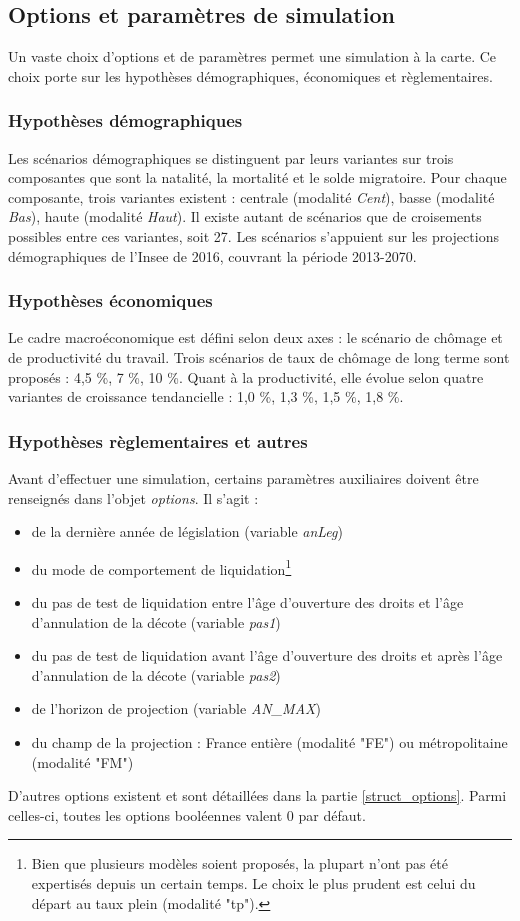 \subsection{Options et paramètres de simulation}
Un vaste choix d'options et de paramètres permet une simulation à la carte. Ce choix porte sur les hypothèses démographiques, économiques et règlementaires.

\subsubsection{Hypothèses démographiques}
Les scénarios démographiques se distinguent par leurs variantes sur trois composantes que sont la natalité, la mortalité et le solde migratoire. Pour chaque composante, trois variantes existent : centrale (modalité \textit{Cent}), basse (modalité \textit{Bas}), haute (modalité \textit{Haut}). Il existe autant de scénarios que de croisements possibles entre ces variantes, soit 27. Les scénarios s'appuient sur les projections démographiques de l'Insee de 2016, couvrant la période 2013-2070.

\subsubsection{Hypothèses économiques}
Le cadre macroéconomique est défini selon deux axes : le scénario de chômage et de productivité du travail. Trois scénarios de taux de chômage de long terme sont proposés : 4,5 \%, 7 \%, 10 \%. Quant à la productivité, elle évolue selon quatre variantes de croissance tendancielle : 1,0 \%, 1,3 \%, 1,5 \%, 1,8 \%.

\subsubsection{Hypothèses règlementaires et autres}
Avant d'effectuer une simulation, certains paramètres auxiliaires doivent être renseignés dans l'objet \textit{options}. Il s'agit :
\begin{itemize}
\item de la dernière année de législation (variable \textit{anLeg})
\item du mode de comportement de liquidation\footnote{Bien que plusieurs modèles soient proposés, la plupart n'ont pas été expertisés depuis un certain temps. Le choix le plus prudent est celui du départ au taux plein (modalité "tp").}
\item du pas de test de liquidation entre l'âge d'ouverture des droits et l'âge d'annulation de la décote (variable \textit{pas1})
\item du pas de test de liquidation avant l'âge d'ouverture des droits et après l'âge d'annulation de la décote (variable \textit{pas2})
\item de l'horizon de projection (variable \textit{AN\_MAX})
\item du champ de la projection : France entière (modalité "FE") ou métropolitaine (modalité "FM")
\end{itemize}
D'autres options existent et sont détaillées dans la partie \ref{struct_options}. Parmi celles-ci, toutes les options booléennes valent 0 par défaut.


